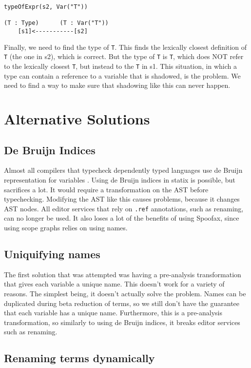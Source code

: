 \begin{lstlisting}
typeOfExpr(s2, Var("T"))
	
(T : Type)      (T : Var("T"))
	[s1]<-----------[s2]
\end{lstlisting}

Finally, we need to find the type of \verb|T|. This finds the lexically closest definition of \verb|T| (the one in s2), which is correct. But the type of \verb|T| is \verb|T|, which does NOT refer to the lexically closest \verb|T|, but instead to the \verb|T| in s1. This situation, in which a type can contain a reference to a variable that is shadowed, is the problem. We need to find a way to make sure that shadowing like this can never happen.

\section{Alternative Solutions}

\subsection{De Bruijn Indices}

Almost all compilers that typecheck dependently typed languages use de Bruijn representation for variables \cite{TODO agda lean etc}. Using de Bruijn indices in statix is possible, but sacrifices a lot. It would require a transformation on the AST before typechecking. Modifying the AST like this causes problems, because it changes AST nodes. All editor services that rely on \verb|.ref| annotations, such as renaming, can no longer be used. It also loses a lot of the benefits of using Spoofax, since using scope graphs relies on using names.

\subsection{Uniquifying names}

The first solution that was attempted was having a pre-analysis transformation that gives each variable a unique name. This doesn't work for a variety of reasons. The simplest being, it doesn't actually solve the problem. Names can be duplicated during beta reduction of terms, so we still don't have the guarantee that each variable has a unique name. Furthermore, this is a pre-analysis transformation, so similarly to using de Bruijn indices, it breaks editor services such as renaming. 

\subsection{Renaming terms dynamically}

